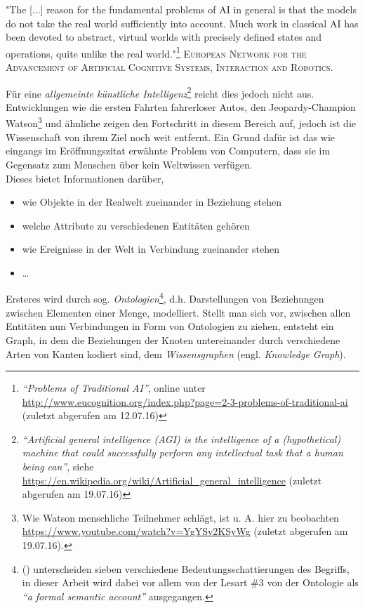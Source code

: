 \newpage
\begin{itquote}
"The [...] reason for the fundamental problems of AI in general is that the models do
 not take the real world sufficiently into account. Much work in classical AI has been devoted to abstract, virtual
 worlds with precisely defined states and operations, quite unlike the real world."\footnote{\emph{``Problems of Traditional AI''},
 online unter \url{http://www.eucognition.org/index.php?page=2-3-problems-of-traditional-ai} (zuletzt abgerufen am 12.07.16)}
 \flushright
 \textsc{European Network for the Advancement of Artificial Cognitive Systems, Interaction
 and Robotics.}
\end{itquote}


Für eine \emph{allgemeinte künstliche Intelligenz}\footnote{\emph{``Artificial general intelligence (AGI) is the intelligence
of a (hypothetical) machine that could successfully perform any intellectual task that a human being can''}, siehe
\url{https://en.wikipedia.org/wiki/Artificial_general_intelligence} (zuletzt abgerufen am 19.07.16)} reicht dies jedoch nicht aus.
Entwicklungen wie die ersten Fahrten fahrerloser Autos, den Jeopardy-Champion Watson\footnote{Wie Watson menschliche Teilnehmer
schlägt, ist u. A. hier zu beobachten \url{https://www.youtube.com/watch?v=YgYSv2KSyWg} (zuletzt abgerufen am 19.07.16).}
und ähnliche zeigen den Fortschritt in diesem Bereich auf, jedoch ist die Wissenschaft von ihrem Ziel noch weit entfernt.
Ein Grund dafür ist das wie eingangs im Eröffnungszitat erwähnte Problem von Computern, dass sie im Gegensatz zum
Menschen über kein Weltwissen verfügen.\\

Dieses bietet Informationen darüber,
\begin{itemize}
  \item wie Objekte in der Realwelt zueinander in Beziehung stehen
  \item welche Attribute zu verschiedenen Entitäten gehören
  \item wie Ereignisse in der Welt in Verbindung zueinander stehen
  \item \ldots
\end{itemize}

Ersteres wird durch sog. \emph{Ontologien}\footnote{(\cite{giaretta1995ontologies}) unterscheiden sieben verschiedene
Bedeutungsschattierungen des Begriffs, in dieser Arbeit wird dabei vor allem von der Lesart \#3 von der Ontologie als
\emph{``a formal semantic account''} ausgegangen.}, d.h. Darstellungen von Beziehungen zwischen Elementen einer Menge, modelliert.
Stellt man sich vor, zwischen allen Entitäten nun Verbindungen in Form von Ontologien zu ziehen, entsteht ein Graph,
in dem die Beziehungen der Knoten untereinander durch verschiedene Arten von Kanten kodiert sind, dem
\emph{Wissensgraphen} (engl. \emph{Knowledge Graph}).\\

